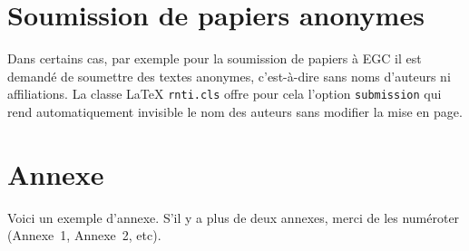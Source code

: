 \documentclass[a4paper,pagenum,french,showlayout]{rnti}
\begin{document}
\section{Soumission de papiers anonymes}

Dans certains cas, par exemple pour la soumission de papiers à EGC il est demandé de soumettre des textes anonymes, c'est-à-dire sans noms d'auteurs ni affiliations. La classe \LaTeX{} \texttt{rnti.cls} offre pour cela l'option \texttt{submission} qui rend automatiquement invisible le nom des auteurs sans modifier la mise en page.




\appendix
\section*{Annexe}

Voici un exemple d'annexe. S'il y a plus de deux annexes, merci de
les numéroter (Annexe~1, Annexe~2, etc).

\Fr
\end{document}
